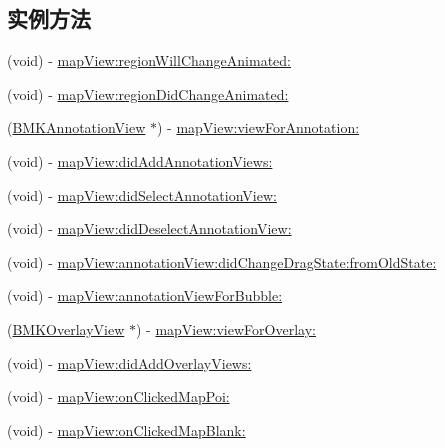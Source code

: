 \subsection*{实例方法}
\begin{DoxyCompactItemize}
\item 
(void) -\/ \hyperlink{protocol_b_m_k_map_view_delegate-p_ae87e30d1d70dd4e8dcff06b5e0cf51a7}{map\-View\-:region\-Will\-Change\-Animated\-:}
\item 
(void) -\/ \hyperlink{protocol_b_m_k_map_view_delegate-p_a6639906de681668b08204765528ce825}{map\-View\-:region\-Did\-Change\-Animated\-:}
\item 
(\hyperlink{interface_b_m_k_annotation_view}{B\-M\-K\-Annotation\-View} $\ast$) -\/ \hyperlink{protocol_b_m_k_map_view_delegate-p_a58eb111045e3e124bcf8abba4d1188d5}{map\-View\-:view\-For\-Annotation\-:}
\item 
(void) -\/ \hyperlink{protocol_b_m_k_map_view_delegate-p_ad982960181ac5b4087f4087e06f16603}{map\-View\-:did\-Add\-Annotation\-Views\-:}
\item 
(void) -\/ \hyperlink{protocol_b_m_k_map_view_delegate-p_a825411129229ae80dbd104596c0d788a}{map\-View\-:did\-Select\-Annotation\-View\-:}
\item 
(void) -\/ \hyperlink{protocol_b_m_k_map_view_delegate-p_a8b3c67fbfebc7d7479a1935269d8302d}{map\-View\-:did\-Deselect\-Annotation\-View\-:}
\item 
(void) -\/ \hyperlink{protocol_b_m_k_map_view_delegate-p_add2407adba384f1dd3c0953590e4a60d}{map\-View\-:annotation\-View\-:did\-Change\-Drag\-State\-:from\-Old\-State\-:}
\item 
(void) -\/ \hyperlink{protocol_b_m_k_map_view_delegate-p_adf11fcfbabf17146fd10d24f5b70aaf2}{map\-View\-:annotation\-View\-For\-Bubble\-:}
\item 
(\hyperlink{interface_b_m_k_overlay_view}{B\-M\-K\-Overlay\-View} $\ast$) -\/ \hyperlink{protocol_b_m_k_map_view_delegate-p_a643e260b01350f089451d745574e3d72}{map\-View\-:view\-For\-Overlay\-:}
\item 
(void) -\/ \hyperlink{protocol_b_m_k_map_view_delegate-p_a4eb0201fbe51ecd74d3b678a139435bf}{map\-View\-:did\-Add\-Overlay\-Views\-:}
\item 
(void) -\/ \hyperlink{protocol_b_m_k_map_view_delegate-p_ac3e98436fce2ee14c02837200e57a6fe}{map\-View\-:on\-Clicked\-Map\-Poi\-:}
\item 
(void) -\/ \hyperlink{protocol_b_m_k_map_view_delegate-p_a7e98b75f0edfc05ed93fda98f3fb682e}{map\-View\-:on\-Clicked\-Map\-Blank\-:}

\end{DoxyCompactItemize}
